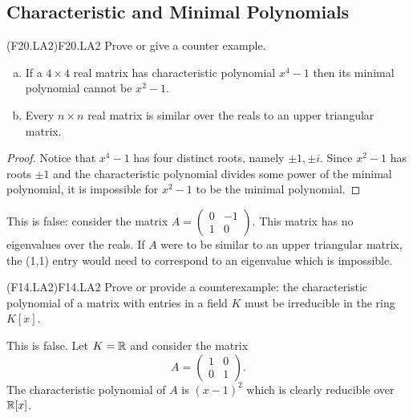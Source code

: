 \documentclass[../AlgebraQualSolutions.tex]{subfiles}
\begin{document}
\subsection{Characteristic and Minimal Polynomials}

\begin{prob}{(F20.LA2)}{F20.LA2}
	Prove or give a counter example.
	\begin{enumerate}[(a)]
	\item If a $4 \times 4$ real matrix has characteristic polynomial $x^4 -1$ then its minimal polynomial cannot be $x^2 - 1$.
	\item Every $n \times n$ real matrix is similar over the reals to an upper triangular matrix.
	\end{enumerate}
	\end{prob}
	
	\begin{proof}
		Notice that $x^4 - 1$ has four distinct roots, namely $\pm 1, \pm i$. Since $x^2 - 1$ has roots $\pm 1$ and the characteristic polynomial divides some power of the minimal polynomial, it is impossible for $x^2 -1$ to be the minimal polynomial.
	\end{proof}
	
	\begin{solution}
		This is false: consider the matrix $A = \begin{pmatrix} 0 & -1\\ 1 & 0\end{pmatrix}$. This matrix has no eigenvalues over the reals. If $A$ were to be similar to an upper triangular matrix, the (1,1) entry would need to correspond to an eigenvalue which is impossible.
	\end{solution}

\begin{prob}{(F14.LA2)}{F14.LA2}
	Prove or provide a counterexample: the characteristic polynomial of a matrix with entries in a field $K$ must be irreducible in the ring $K[x]$.
\end{prob}

\begin{solution}
	This is false. Let $K = \mathbb{R}$ and consider the matrix
		\[A = \begin{pmatrix} 1 & 0 \\ 0 & 1 \end{pmatrix}. \]
	The characteristic polynomial of $A$ is $(x-1)^2$ which is clearly reducible over $\mathbb{R}[x]$.
\end{solution}
\end{document}

